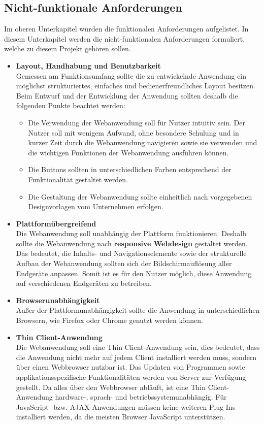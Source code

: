 \subsection{Nicht-funktionale Anforderungen}
\label{sec:nicht-funktionale anforderungen}
Im oberen Unterkapitel wurden die funktionalen Anforderungen aufgelistet. In diesem Unterkapitel werden die nicht-funktionalen Anforderungen formuliert, welche zu diesem Projekt gehören sollen.

\begin{itemize}
\item \textbf{Layout, Handhabung und Benutzbarkeit}\\
Gemessen am Funktionsumfang sollte die zu entwickelnde Anwendung ein möglichst strukturiertes, einfaches und bedienerfreundliches Layout besitzen. Beim Entwurf und der Entwicklung der Anwendung sollten deshalb die folgenden Punkte beachtet werden:
\begin{itemize}
\item Die Verwendung der Webanwendung soll für Nutzer intuitiv sein. Der Nutzer soll mit wenigem Aufwand, ohne besondere Schulung und in kurzer Zeit durch die Webanwendung navigieren sowie sie verwenden und die wichtigen Funktionen der Webanwendung ausführen können.
\item Die Buttons sollten in unterschiedlichen Farben entsprechend der Funktionalität gestaltet werden.
\item Die Gestaltung der Webanwendung sollte einheitlich nach vorgegebenen Designvorlagen vom Unternehmen erfolgen.
\end{itemize}
\item \textbf{Plattformübergreifend}\\
Die Webanwendung soll unabhängig der Plattform funktionieren. Deshalb sollte die Webanwendung nach \textbf{responsive Webdesign} gestaltet werden. Das bedeutet, die Inhalts- und Navigationselemente sowie der strukturelle Aufbau der Webanwendung sollten sich der Bildschirmauflösung aller Endgeräte anpassen. Somit ist es für den Nutzer möglich, diese Anwendung auf verschiedenen Endgeräten zu betreiben.
\item \textbf{Browserunabhängigkeit}\\
Außer der Plattformunabhängigkeit sollte die Anwendung in unterschiedlichen Browsern, wie Firefox oder Chrome genutzt werden können.
\item \textbf{Thin Client-Anwendung}\\
Die Webanwendung soll eine Thin Client-Anwendung sein, dies bedeutet, dass die Anwendung nicht mehr auf jedem Client installiert werden muss, sondern über einen Webbrowser nutzbar ist. Das Updaten von Programmen sowie applikationsspezifische Funktionalitäten werden von Server zur Verfügung gestellt. Da alles über den Webbrowser abläuft, ist eine Thin Client-Anwendung hardware-, sprach- und betriebssystemunabhängig. Für JavaScript- bzw. AJAX-Anwendungen müssen keine weiteren Plug-Ins installiert werden, da die meisten Browser JavaScript unterstützen. 

\end{itemize}
